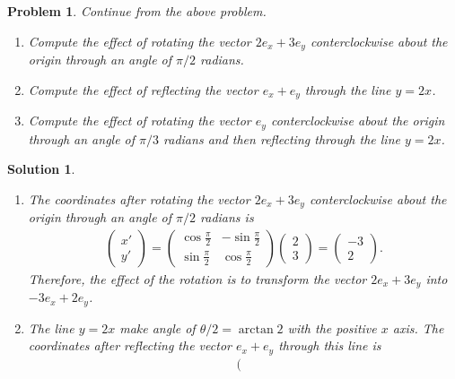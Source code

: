 \documentclass[UTF8,10pt,a4paper]{article}
\theoremstyle{Problem}
\newtheorem{prob}{Problem}
\theoremstyle{Solution}
\newtheorem*{sol}{Solution}
\begin{document}
\begin{prob}
    Continue from the above problem.
    \begin{enumerate}
        \item[(a)] Compute the effect of rotating the vector $2e_x+3e_y$ conterclockwise about the origin through an angle of $\pi/2$ radians.
        \item[(b)] Compute the effect of reflecting the vector $e_x+e_y$ through the line $y=2x$.
        \item[(c)] Compute the effect of rotating the vector $e_y$ conterclockwise about the origin through an angle of $\pi/3$ radians and then reflecting through the line $y=2x$.
    \end{enumerate}
\end{prob}
\begin{sol}
    \begin{enumerate}
        \item[(a)] The coordinates after rotating the vector $2e_x+3e_y$ conterclockwise about the origin through an angle of $\pi/2$ radians is
        \begin{align}
            \left(\begin{matrix}
                x'\\
                y'
            \end{matrix}\right)=\left(\begin{matrix}
                \cos\frac{\pi}{2}&-\sin\frac{\pi}{2}\\
                \sin\frac{\pi}{2}&\cos\frac{\pi}{2}
            \end{matrix}\right)\left(\begin{matrix}
                2\\
                3
            \end{matrix}\right)=\left(\begin{matrix}
                -3\\
                2
            \end{matrix}\right).
        \end{align}
        Therefore, the effect of the rotation is to transform the vector $2e_x+3e_y$ into $-3e_x+2e_y$.
        \item[(b)] The line $y=2x$ make angle of $\theta/2=\arctan 2$ with the positive $x$ axis. The coordinates after reflecting the vector $e_x+e_y$ through this line is
        \begin{align}
            \left(\begin{matrix}

\end{matrix}
\end{align}
\end{enumerate}
\end{sol}
\end{document}
